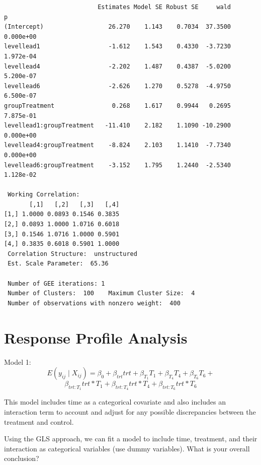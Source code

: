 \documentclass[
  letterpaper,
  DIV=11,
  numbers=noendperiod]{scrreprt}
\begin{document}
\begin{verbatim}
                          Estimates Model SE Robust SE     wald         p
(Intercept)                  26.270    1.143    0.7034  37.3500 0.000e+00
levellead1                   -1.612    1.543    0.4330  -3.7230 1.972e-04
levellead4                   -2.202    1.487    0.4387  -5.0200 5.200e-07
levellead6                   -2.626    1.270    0.5278  -4.9750 6.500e-07
groupTreatment                0.268    1.617    0.9944   0.2695 7.875e-01
levellead1:groupTreatment   -11.410    2.182    1.1090 -10.2900 0.000e+00
levellead4:groupTreatment    -8.824    2.103    1.1410  -7.7340 0.000e+00
levellead6:groupTreatment    -3.152    1.795    1.2440  -2.5340 1.128e-02

 Working Correlation: 
       [,1]   [,2]   [,3]   [,4]
[1,] 1.0000 0.0893 0.1546 0.3835
[2,] 0.0893 1.0000 1.0716 0.6018
[3,] 0.1546 1.0716 1.0000 0.5901
[4,] 0.3835 0.6018 0.5901 1.0000
 Correlation Structure:  unstructured 
 Est. Scale Parameter:  65.36 

 Number of GEE iterations: 1 
 Number of Clusters:  100    Maximum Cluster Size:  4 
 Number of observations with nonzero weight:  400 
\end{verbatim}

\hypertarget{response-profile-analysis}{%
\section{Response Profile Analysis}\label{response-profile-analysis}}

Model 1:
\[E(y_{ij} \mid X_{ij}) = \beta_0 +  \beta_{trt}trt +  \beta_{T_1}T_1 +  \beta_{T_4}T_4 +  \beta_{T_6}T_6 +  \]
\[\beta_{trt:T_1}trt*T_1+ \beta_{trt:T_4}trt*T_4 + \beta_{trt:T_6}trt*T_6\]

This model includes time as a categorical covariate and also includes an
interaction term to account and adjust for any possible discrepancies
between the treatment and control.

Using the GLS approach, we can fit a model to include time, treatment,
and their interaction as categorical variables (use dummy variables).
What is your overall conclusion?
\end{document}
